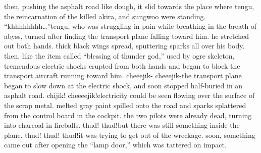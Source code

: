  then, pushing the asphalt road like dough, it slid towards the place where tengu, the reincarnation of the killed akira, and sungwoo were standing.
“khhhhhhhh…”tengu, who was struggling in pain while breathing in the breath of abyss, turned after finding the transport plane falling toward him.
 he stretched out both hands.
thick black wings spread, sputtering sparks all over his body.
then, like the item called “blessing of thunder god,” used by ogre skeleton, tremendous electric shocks erupted from both hands and began to block the transport aircraft running toward him.
cheeejik- cheeejik-the transport plane began to slow down at the electric shock, and soon stopped half-buried in an asphalt road.
chijik! cheeeejik!electricity could be seen flowing over the surface of the scrap metal.
 melted gray paint spilled onto the road and sparks splattered from the control board in the cockpit.
 the two pilots were already dead, turning into charcoal in fireballs.
thud! thud!but there was still something inside the plane.
thud! thud! thud!it was trying to get out of the wreckage.
soon, something came out after opening the “lamp door,” which was tattered on impact.

